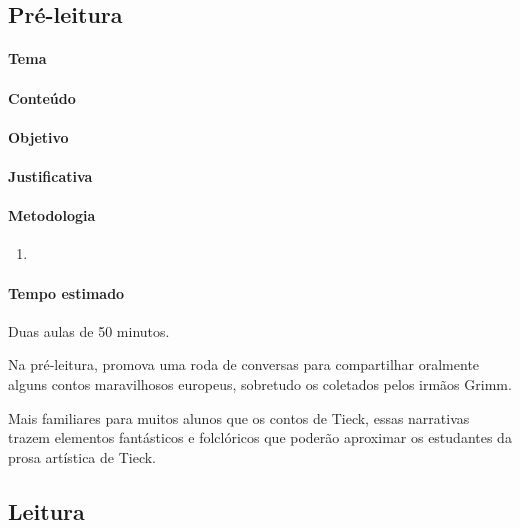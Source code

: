 \documentclass[11pt]{extarticle}
\begin{document}

\subsection{Pré-leitura}


\paragraph{Tema}

\paragraph{Conteúdo}

\paragraph{Objetivo}

\paragraph{Justificativa}

\paragraph{Metodologia}
\begin{enumerate}

\item 

\end{enumerate}

\paragraph{Tempo estimado} Duas aulas de 50 minutos. 

Na pré-leitura, promova uma roda de conversas para
compartilhar oralmente alguns contos maravilhosos europeus, sobretudo os
coletados pelos irmãos Grimm.

Mais familiares para muitos alunos que os contos de Tieck, essas
narrativas trazem elementos fantásticos e folclóricos que poderão
aproximar os estudantes da prosa artística de Tieck.

\subsection{Leitura}
\end{document}
